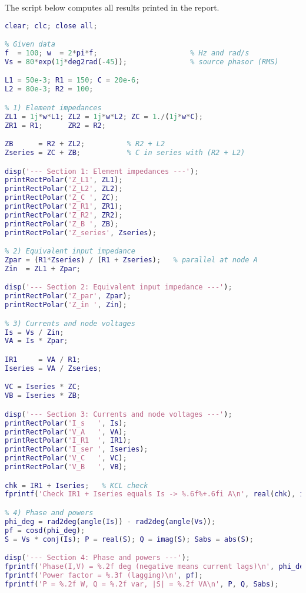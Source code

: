 \documentclass{article}
\begin{document}
\noindent
The script below computes all results printed in the report.

\begin{lstlisting}[language=Matlab,caption={week2\_ex2\_variantC.m}]
%% Week 2 - Exercise 2 (Variant C) - Impedance and AC Circuit Analysis
clear; clc; close all;

% Given data
f  = 100; w  = 2*pi*f;                      % Hz and rad/s
Vs = 80*exp(1j*deg2rad(-45));               % source phasor (RMS)

L1 = 50e-3; R1 = 150; C = 20e-6;
L2 = 80e-3; R2 = 100;

% 1) Element impedances
ZL1 = 1j*w*L1; ZL2 = 1j*w*L2; ZC = 1./(1j*w*C);
ZR1 = R1;      ZR2 = R2;

ZB      = R2 + ZL2;          % R2 + L2
Zseries = ZC + ZB;           % C in series with (R2 + L2)

disp('--- Section 1: Element impedances ---');
printRectPolar('Z_L1', ZL1);
printRectPolar('Z_L2', ZL2);
printRectPolar('Z_C ', ZC);
printRectPolar('Z_R1', ZR1);
printRectPolar('Z_R2', ZR2);
printRectPolar('Z_B ', ZB);
printRectPolar('Z_series', Zseries);

% 2) Equivalent input impedance
Zpar = (R1*Zseries) / (R1 + Zseries);   % parallel at node A
Zin  = ZL1 + Zpar;

disp('--- Section 2: Equivalent input impedance ---');
printRectPolar('Z_par', Zpar);
printRectPolar('Z_in ', Zin);

% 3) Currents and node voltages
Is = Vs / Zin;
VA = Is * Zpar;

IR1     = VA / R1;
Iseries = VA / Zseries;

VC = Iseries * ZC;
VB = Iseries * ZB;

disp('--- Section 3: Currents and node voltages ---');
printRectPolar('I_s   ', Is);
printRectPolar('V_A   ', VA);
printRectPolar('I_R1  ', IR1);
printRectPolar('I_ser ', Iseries);
printRectPolar('V_C   ', VC);
printRectPolar('V_B   ', VB);

chk = IR1 + Iseries;   % KCL check
fprintf('Check IR1 + Iseries equals Is -> %.6f%+.6fi A\n', real(chk), imag(chk));

% 4) Phase and powers
phi_deg = rad2deg(angle(Is)) - rad2deg(angle(Vs));
pf = cosd(phi_deg);
S = Vs * conj(Is); P = real(S); Q = imag(S); Sabs = abs(S);

disp('--- Section 4: Phase and powers ---');
fprintf('Phase(I,V) = %.2f deg (negative means current lags)\n', phi_deg);
fprintf('Power factor = %.3f (lagging)\n', pf);
fprintf('P = %.2f W, Q = %.2f var, |S| = %.2f VA\n', P, Q, Sabs);


\end{lstlisting}
\end{document}
